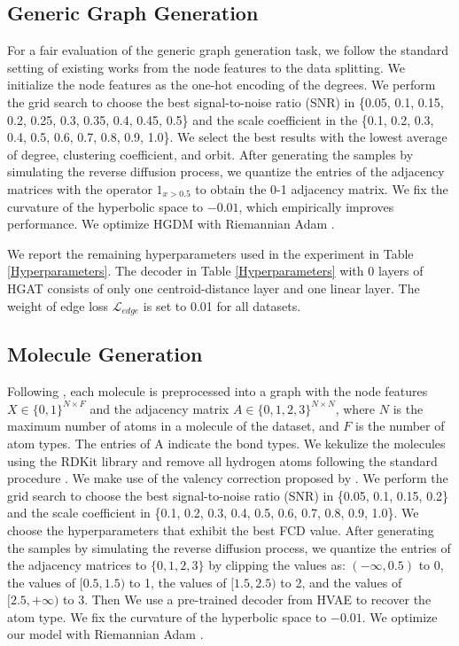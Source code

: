 \documentclass[letterpaper]{article} %
\begin{document}
\subsection{Generic Graph Generation}
For a fair evaluation of the generic graph generation task, we follow the standard setting of existing works \cite{jo2022score,you2018graphrnn,liu2019graph,niu2020permutation} from the node features to the data splitting. We initialize the node features as the one-hot encoding of the degrees. We perform the grid search to choose the best signal-to-noise ratio (SNR) in \{0.05, 0.1, 0.15, 0.2, 0.25, 0.3, 0.35, 0.4, 0.45, 0.5\} and the scale coefficient in the \{0.1, 0.2, 0.3, 0.4, 0.5, 0.6, 0.7, 0.8, 0.9, 1.0\}. We select the best results with the lowest average of degree, clustering coefficient, and orbit. After generating the samples by simulating the reverse diffusion process, we quantize the entries of the adjacency matrices with the operator $1_{x>0.5}$ to obtain the 0-1 adjacency matrix. 
We fix the curvature of the hyperbolic space to $-0.01$, which empirically improves performance. We optimize HGDM with Riemannian Adam \cite{becigneul2018riemannian,kochurov2020geoopt}. 

We report the remaining hyperparameters used in the experiment in Table \ref{Hyperparameters}. The decoder in Table \ref{Hyperparameters} with 0 layers of HGAT consists of only one centroid-distance layer \cite{liu2019hyperbolic} and one linear layer. The weight of edge loss $\mathcal{L}_{\textit{edge}}$ is set to 0.01 for all datasets.

\subsection{Molecule Generation}
Following \citet{jo2022score}, each molecule is preprocessed into a graph with the node features $X \in \{0, 1\}^{N\times F}$ and the adjacency matrix $A \in \{0, 1, 2, 3\}^{N\times N}$, where $N$ is the maximum number of atoms in a molecule of the dataset, and $F$ is the number of atom types. The entries of A indicate the bond types. We kekulize the molecules using the RDKit library \cite{landrum2016rdkit} and remove all hydrogen atoms following the standard procedure \cite{shi2020graphaf,luo2021graphdf}. We make use of the valency correction proposed by \citet{zang2020moflow}. We perform the grid search to choose the best signal-to-noise ratio (SNR) in \{0.05, 0.1, 0.15, 0.2\} and the scale coefficient in \{0.1, 0.2, 0.3, 0.4, 0.5, 0.6, 0.7, 0.8, 0.9, 1.0\}. We choose the hyperparameters that exhibit the best FCD value. After generating the samples by simulating the reverse diffusion process, we quantize the entries of the adjacency matrices to $\{0, 1, 2, 3\}$ by clipping the values as: $(-\infty, 0.5)$ to 0, the values of $[0.5, 1.5)$ to 1, the values of $[1.5, 2.5)$ to 2, and the values of $[2.5, +\infty)$ to 3. Then We use a pre-trained decoder from HVAE to recover the atom type. We fix the curvature of the hyperbolic space to $-0.01$. We optimize our model with Riemannian Adam \cite{becigneul2018riemannian,kochurov2020geoopt}. 
\end{document}
